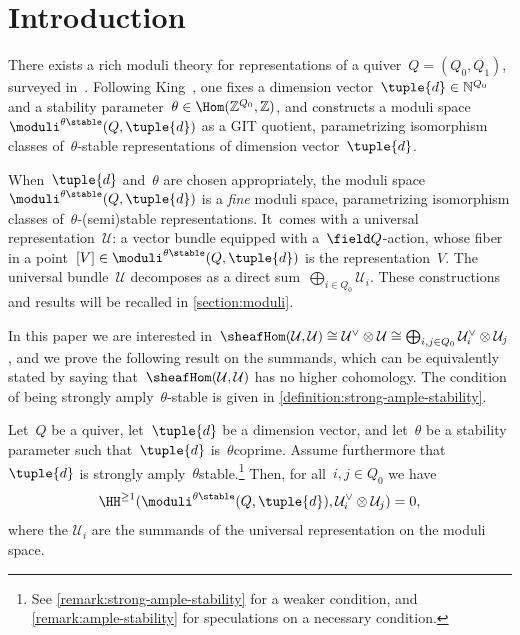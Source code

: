 \section{Introduction}
\label{section:introduction}
There exists a rich moduli theory for representations of a quiver~$Q=(Q_0,Q_1)$,
surveyed in~\cite{MR2484736}.
Following King~\cite{MR1315461},
one fixes a dimension vector~$\tuple{d}\in\mathbb{N}^{Q_0}$
and a stability parameter~$\theta\in\Hom(\mathbb{Z}^{Q_0},\mathbb{Z})$,
and constructs a moduli space~$\moduli^{\theta\stable}(Q,\tuple{d})$ as a GIT quotient,
parametrizing isomorphism classes of~$\theta$-stable representations
of dimension vector~$\tuple{d}$.

When~$\tuple{d}$ and~$\theta$ are chosen appropriately,
the moduli space~$\moduli^{\theta\stable}(Q,\tuple{d})$
is a \emph{fine} moduli space,
parametrizing isomorphism classes of~$\theta$-(semi)stable representations. It~comes with a universal representation~$\mathcal{U}$:
a vector bundle equipped with a~$\field Q$\nobreakdash-action,
whose fiber in a point~$[V]\in\moduli^{\theta\stable}(Q,\tuple{d})$
is the representation~$V$.
The universal bundle~$\mathcal{U}$ decomposes as a direct sum~$\bigoplus_{i\in Q_0}\mathcal{U}_i$.
These constructions and results will be recalled in \cref{section:moduli}.

In this paper
we are interested in~$\sheafHom(\mathcal{U},\mathcal{U})\cong\mathcal{U}^\vee\otimes\mathcal{U}\cong\bigoplus_{i,j\in Q_0}\mathcal{U}_i^\vee\otimes\mathcal{U}_j$,
and we prove the following result on the summands,
which can be equivalently stated by saying that~$\sheafHom(\mathcal{U},\mathcal{U})$
has no higher cohomology.
The condition of being strongly amply~$\theta$-stable
is given in \cref{definition:strong-ample-stability}.

\begin{alphatheorem}
\label{theorem:cohomology-vanishing}
Let~$Q$ be a quiver,
let~$\tuple{d}$ be a dimension vector,
and let~$\theta$ be a stability parameter
such that~$\tuple{d}$ is~$\theta$\dash coprime.
Assume furthermore that~$\tuple{d}$ is strongly amply~$\theta$\dash stable.\footnote{See \cref{remark:strong-ample-stability} for a weaker condition,
and \cref{remark:ample-stability} for speculations on a necessary condition.}
Then, for all~$i,j \in Q_0$ we have
\begin{equation}
\label{equation:cohomology-vanishing}
\HH^{\geq1}(\moduli^{\theta\stable}(Q,\tuple{d}), \mathcal{U}^\vee_i \otimes \mathcal{U}_j) = 0,
\end{equation}
where the $\mathcal{U}_i$ are the summands of
the universal representation on the moduli space.
\end{alphatheorem}


